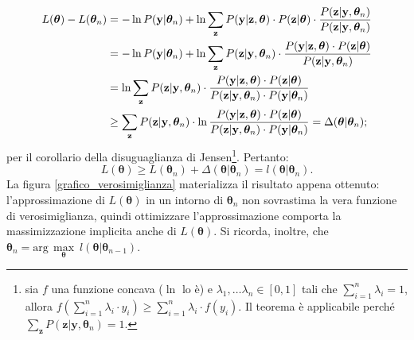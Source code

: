 \begin{equation}
	\begin{split}
		L(\boldsymbol{\theta}) - L(\boldsymbol{\theta}_n) & = -\ln P(\mathbf{y}|\boldsymbol{\theta}_n) + \ln\sum_{\mathbf{z}}^{} P(\mathbf{y}|\mathbf{z},\boldsymbol{\theta})\cdot P(\mathbf{z}|\boldsymbol{\theta})\cdot\frac{\textcolor{black}{P(\mathbf{z}|\mathbf{y},\boldsymbol{\theta}_n)}}{\textcolor{black}{P(\mathbf{z}|\mathbf{y},\boldsymbol{\theta}_n)}} \\
		& = \textcolor{black}{-\ln P(\mathbf{y}|\boldsymbol{\theta}_n)} + \ln\sum_{\mathbf{z}}^{} \textcolor{black}{P(\mathbf{z}|\mathbf{y},\boldsymbol{\theta}_n)}\cdot\frac{P(\mathbf{y}|\mathbf{z},\boldsymbol{\theta})\cdot P(\mathbf{z}|\boldsymbol{\theta})}{\textcolor{black}{P(\mathbf{z}|\mathbf{y},\boldsymbol{\theta}_n)}} \\
		& = \ln\sum_{\mathbf{z}}^{} \textcolor{black}{P(\mathbf{z}|\mathbf{y},\boldsymbol{\theta}_n)}\cdot\frac{P(\mathbf{y}|\mathbf{z},\boldsymbol{\theta})\cdot P(\mathbf{z}|\boldsymbol{\theta})}{\textcolor{black}{P(\mathbf{z}|\mathbf{y},\boldsymbol{\theta}_n)}\cdot\textcolor{black}{ P(\mathbf{y}|\boldsymbol{\theta}_n)}} \\
		& \geq\sum_{\mathbf{z}}^{}\textcolor{black}{P(\mathbf{z}|\mathbf{y},\boldsymbol{\theta}_n)}\cdot\ln\frac{P(\mathbf{y}|\mathbf{z},\boldsymbol{\theta})\cdot P(\mathbf{z}|\boldsymbol{\theta})}{\textcolor{black}{P(\mathbf{z}|\mathbf{y},\boldsymbol{\theta}_n)}\cdot P(\mathbf{y}|\boldsymbol{\theta}_n)} =\Delta(\boldsymbol{\theta}|\boldsymbol{\theta}_n);
	\end{split}
\end{equation}
per il corollario della disuguaglianza di Jensen\footnote{sia $f$ una funzione concava ($\ln$ lo è) e $\lambda_1,\dots\lambda_n\in [0,1]$ tali che $\sum_{i=1}^{n}\lambda_i = 1$, allora $f(\sum_{i=1}^{n}\lambda_i\cdot y_i)\geq\sum_{i=1}^{n}\lambda_i\cdot f(y_i)$. Il teorema è applicabile perché $\sum_{\mathbf{z}}^{} P(\mathbf{z}|\mathbf{y},\boldsymbol{\theta}_n)=1$.}. Pertanto:
\begin{equation}
	L(\boldsymbol{\theta})\geq L(\boldsymbol{\theta}_n)+\Delta(\boldsymbol{\theta}|\boldsymbol{\theta}_n)= l(\boldsymbol{\theta}|\boldsymbol{\theta}_n).
\end{equation}
La figura \ref{grafico_verosimiglianza} materializza il risultato appena ottenuto: l'approssimazione di $L(\boldsymbol{\theta})$ in un intorno di $\boldsymbol{\theta}_n$ non sovrastima la vera funzione di verosimiglianza, quindi ottimizzare l'approssimazione comporta la massimizzazione implicita anche di $L(\boldsymbol{\theta})$. Si ricorda, inoltre, che $\boldsymbol{\theta}_n = \text{arg}\,\max\limits_{\boldsymbol{\theta}} \ l(\boldsymbol{\theta}|\boldsymbol{\theta}_{n-1})$.

